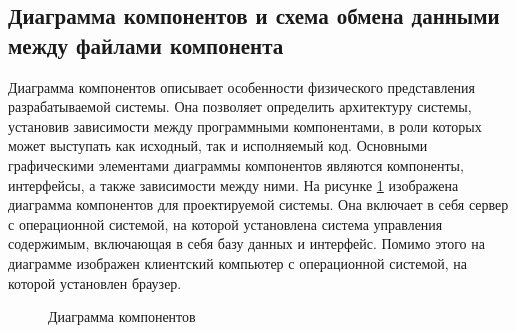 \subsection{Диаграмма компонентов и схема обмена данными между файлами компонента}

Диаграмма компонентов описывает особенности физического представления разрабатываемой системы. Она позволяет определить архитектуру системы, установив зависимости между программными компонентами, в роли которых может выступать как исходный, так и исполняемый код. Основными графическими элементами диаграммы компонентов являются компоненты, интерфейсы, а также зависимости между ними. На рисунке \ref{comp:image} изображена диаграмма компонентов для проектируемой системы. Она включает в себя сервер с операционной системой, на которой установлена система управления содержимым, включающая в себя базу данных и интерфейс. Помимо этого на диаграмме изображен клиентский компьютер с операционной системой, на которой установлен браузер.

\begin{figure}[ht]
\caption{Диаграмма компонентов}
\label{comp:image}
\end{figure}

%
%
%
%
%

